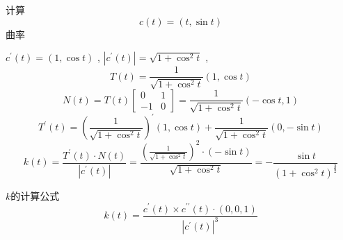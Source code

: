 \documentclass[../../古典微分几何.tex]{subfiles}
\begin{document}
\begin{example}
    计算 \[
    c\left( t \right)= \left( t,\sin t \right)  
    \]曲率 
    \begin{solution}
        \(  c^{\prime} \left( t \right)= \left( 1,\cos t \right)    \) , \(  \left| c^{\prime} \left( t \right)  \right|= \sqrt{1+ \cos ^{2}t}   \) , \[
        T\left( t \right)=  \frac{1 }{\sqrt{1+ \cos ^{2}t} } \left( 1,\cos t \right)   
        \] \[
        N\left( t \right)= T\left( t \right) \begin{bmatrix} 
            0&1\\ 
             -1&0 
        \end{bmatrix} =  \frac{1 }{\sqrt{1+ \cos ^{2}t} } \left( -\cos t,1 \right)     
        \] \[
        T^{\prime} \left( t \right)=  \left( \frac{1 }{\sqrt{1+ \cos ^{2}t} }  \right)^{\prime} \left( 1,\cos t \right)+  \frac{1 }{\sqrt{1+ \cos ^{2}t} } \left( 0,-\sin t \right)     
        \] \[
        k\left( t \right)=  \frac{T^{\prime} \left( t \right)\cdot N\left( t \right)   }{\left| c^{\prime} \left( t \right)  \right|  } = \frac{  \left( \frac{1 }{\sqrt{1+ \cos ^{2}t} }  \right)^{2} \cdot \left( -\sin t \right)     }{ \sqrt{1+ \cos ^{2}t}}  =  - \frac{\sin t }{\left( 1+ \cos ^{2}t \right)^{\frac{3}{2}}  } 
        \]
    \end{solution}
    
    \hspace*{\fill} 
    
\end{example}

\hspace*{\fill} 

\begin{proposition}{\(  k  \)的计算公式 }
  \[
    k\left( t \right)=  \frac{c^{\prime} \left( t \right)\times  c ^{\prime \prime} \left( t \right) \cdot \left( 0,0,1 \right)    }{\left| c^{\prime} \left( t \right)  \right|^{3}  }  
    \]
\end{proposition}
\end{document}
